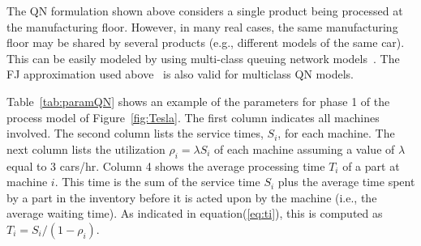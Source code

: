 \documentclass[a4paper, 12pt]{article} %
\begin{document}
The QN formulation shown above considers a single product being processed at the manufacturing floor. However, in many real cases, the same manufacturing floor may be shared by several products (e.g., different 
models of the same car). This can be easily modeled by using multi-class queuing network models~\cite{MAD2004}. The FJ approximation used above~\cite{AlomariMenasce} is also valid for multiclass QN models.

Table~\ref{tab:paramQN} shows an example of the parameters for phase 1 of the process model of Figure~\ref{fig:Tesla}. The first column indicates all machines involved. The second column lists the service times, $S_i$, for each machine. The next column lists the utilization $\rho_i = \lambda S_i$ of each machine assuming a value of $\lambda$ equal to 3 cars/hr. Column 4 shows the average processing time $T_i$ of a part at machine $i$. This time is the sum of the service time $S_i$ plus the average time spent by a part in the inventory before it is acted upon by the machine (i.e., the average waiting time). As indicated in equation(\ref{eq:ti}), this is computed as $T_i = S_i / (1 - \rho_i)$.
\end{document}
